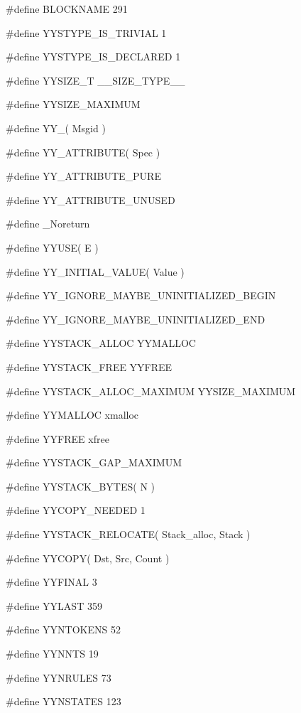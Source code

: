 \medskip
{\stt \#define BLOCKNAME 291}

\medskip
{\stt \#define YYSTYPE\_IS\_TRIVIAL 1}

\medskip
{\stt \#define YYSTYPE\_IS\_DECLARED 1}

\medskip
{\stt \#define YYSIZE\_T \_\_SIZE\_TYPE\_\_}

\medskip
{\stt \#define YYSIZE\_MAXIMUM}

\medskip
{\stt \#define YY\_( Msgid )}

\medskip
{\stt \#define YY\_ATTRIBUTE( Spec )}

\medskip
{\stt \#define YY\_ATTRIBUTE\_PURE}

\medskip
{\stt \#define YY\_ATTRIBUTE\_UNUSED}

\medskip
{\stt \#define \_Noreturn}

\medskip
{\stt \#define YYUSE( E )}

\medskip
{\stt \#define YY\_INITIAL\_VALUE( Value )}

\medskip
{\stt \#define YY\_IGNORE\_MAYBE\_UNINITIALIZED\_BEGIN}

\medskip
{\stt \#define YY\_IGNORE\_MAYBE\_UNINITIALIZED\_END}

\medskip
{\stt \#define YYSTACK\_ALLOC YYMALLOC}

\medskip
{\stt \#define YYSTACK\_FREE YYFREE}

\medskip
{\stt \#define YYSTACK\_ALLOC\_MAXIMUM YYSIZE\_MAXIMUM}

\medskip
{\stt \#define YYMALLOC xmalloc}

\medskip
{\stt \#define YYFREE xfree}

\medskip
{\stt \#define YYSTACK\_GAP\_MAXIMUM}

\medskip
{\stt \#define YYSTACK\_BYTES( N )}

\medskip
{\stt \#define YYCOPY\_NEEDED 1}

\medskip
{\stt \#define YYSTACK\_RELOCATE( Stack\_alloc, Stack )}

\medskip
{\stt \#define YYCOPY( Dst, Src, Count )}

\medskip
{\stt \#define YYFINAL 3}

\medskip
{\stt \#define YYLAST 359}

\medskip
{\stt \#define YYNTOKENS 52}

\medskip
{\stt \#define YYNNTS 19}

\medskip
{\stt \#define YYNRULES 73}

\medskip
{\stt \#define YYNSTATES 123}

